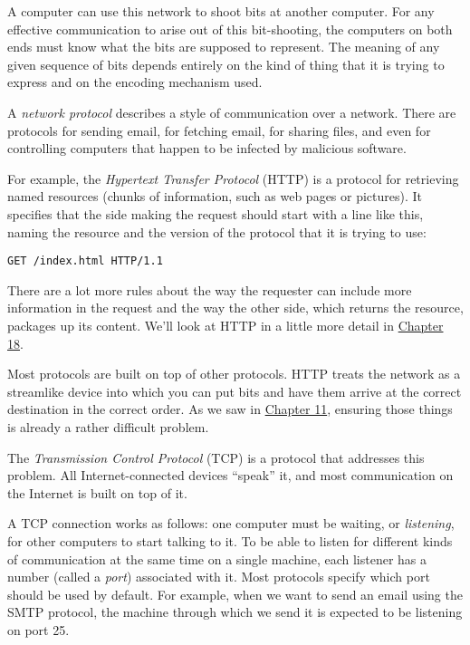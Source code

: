 A computer can use this network to shoot bits at another computer. For any effective communication to arise out of this bit-shooting, the computers on both ends must know what the bits are supposed to represent. The meaning of any given sequence of bits depends entirely on the kind of thing that it is trying to express and on the encoding mechanism used.

A \emph{network protocol} describes a style of communication over a network. There are protocols for sending email, for fetching email, for sharing files, and even for controlling computers that happen to be infected by malicious software.

For example, the \emph{Hypertext Transfer Protocol} (HTTP) is a protocol for retrieving named resources (chunks of information, such as web pages or pictures). It specifies that the side making the request should start with a line like this, naming the resource and the version of the protocol that it is trying to use:

\begin{lstlisting}
GET /index.html HTTP/1.1
\end{lstlisting}
\noindent

There are a lot more rules about the way the requester can include more information in the request and the way the other side, which returns the resource, packages up its content. We'll look at HTTP in a little more detail in \hyperref[http]{Chapter 18}.

Most protocols are built on top of other protocols. HTTP treats the network as a streamlike device into which you can put bits and have them arrive at the correct destination in the correct order. As we saw in \hyperref[async]{Chapter 11}, ensuring those things is already a rather difficult problem.

The \emph{Transmission Control Protocol} (TCP) is a protocol that addresses this problem. All Internet-connected devices ``speak'' it, and most communication on the Internet is built on top of it.

A TCP connection works as follows: one computer must be waiting, or \emph{listening}, for other computers to start talking to it. To be able to listen for different kinds of communication at the same time on a single machine, each listener has a number (called a \emph{port}) associated with it. Most protocols specify which port should be used by default. For example, when we want to send an email using the SMTP protocol, the machine through which we send it is expected to be listening on port 25.

